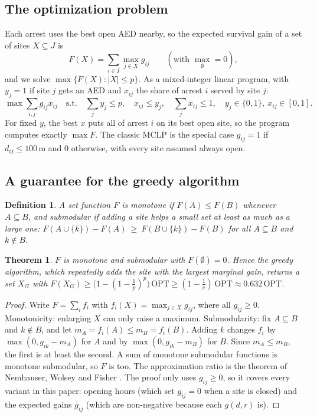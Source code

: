 \documentclass[11pt]{article}
\newtheorem{theorem}{Theorem}
\newtheorem{definition}{Definition}
\begin{document}
\subsection{The optimization problem}
Each arrest uses the best open AED nearby, so the expected survival gain of a set of sites $X\subseteq J$ is
\[
F(X) = \sum_{i\in I} \max_{j\in X} g_{ij} \qquad (\text{with } \max_{\emptyset}=0),
\]
and we solve $\max\{F(X): |X|\le p\}$. As a mixed-integer linear program, with $y_j=1$ if site $j$ gets an AED and $x_{ij}$ the share of arrest $i$ served by site $j$:
\[
\max \sum_{i,j} g_{ij}x_{ij}\quad\text{s.t.}\quad \sum_j y_j\le p,\quad x_{ij}\le y_j,\quad \sum_j x_{ij}\le 1,\quad y_j\in\{0,1\},\ x_{ij}\in[0,1].
\]
For fixed $y$, the best $x$ puts all of arrest $i$ on its best open site, so the program computes exactly $\max F$. The classic MCLP is the special case $g_{ij}=1$ if $d_{ij}\le 100$\,m and $0$ otherwise, with every site assumed always open.

\subsection{A guarantee for the greedy algorithm}
\begin{definition}
A set function $F$ is \emph{monotone} if $F(A)\le F(B)$ whenever $A\subseteq B$, and \emph{submodular} if adding a site helps a small set at least as much as a large one: $F(A\cup\{k\})-F(A)\ \ge\ F(B\cup\{k\})-F(B)$ for all $A\subseteq B$ and $k\notin B$.
\end{definition}

\begin{theorem}
$F$ is monotone and submodular with $F(\emptyset)=0$. Hence the greedy algorithm, which repeatedly adds the site with the largest marginal gain, returns a set $X_G$ with $F(X_G)\ge\bigl(1-(1-\tfrac1p)^p\bigr)\,\mathrm{OPT}\ge(1-\tfrac1e)\,\mathrm{OPT}\approx 0.632\,\mathrm{OPT}$.
\end{theorem}
\begin{proof}
Write $F=\sum_i f_i$ with $f_i(X)=\max_{j\in X} g_{ij}$, where all $g_{ij}\ge 0$. Monotonicity: enlarging $X$ can only raise a maximum. Submodularity: fix $A\subseteq B$ and $k\notin B$, and let $m_A=f_i(A)\le m_B=f_i(B)$. Adding $k$ changes $f_i$ by $\max(0,g_{ik}-m_A)$ for $A$ and by $\max(0,g_{ik}-m_B)$ for $B$. Since $m_A\le m_B$, the first is at least the second. A sum of monotone submodular functions is monotone submodular, so $F$ is too. The approximation ratio is the theorem of Nemhauser, Wolsey and Fisher \cite{nemhauser1978}. The proof only uses $g_{ij}\ge 0$, so it covers every variant in this paper: opening hours (which set $g_{ij}=0$ when a site is closed) and the expected gains $\bar g_{ij}$ (which are non-negative because each $g(d,r)$ is).
\end{proof}
\end{document}
